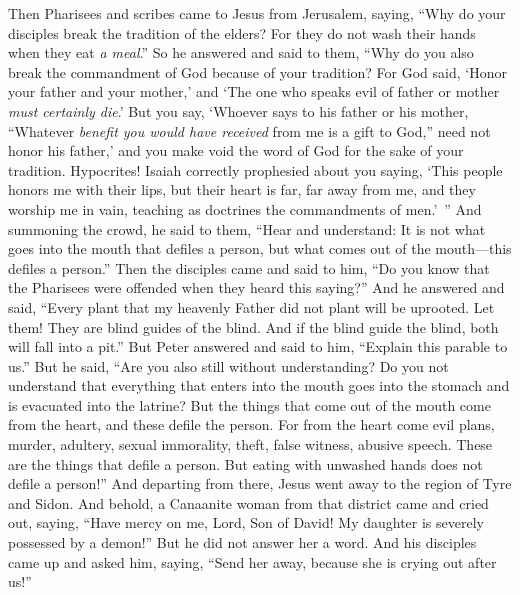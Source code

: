 \begin{biblechapter} %
 Then Pharisees and scribes came to Jesus from Jerusalem, saying,
\verse “Why do your disciples break the tradition of the elders? For they do not wash their hands when they eat \textit{a meal}.”
\verse So he answered and said to them, “Why do you also break the commandment of God because of your tradition?
\verse For God said, ‘Honor your father and your mother,’ and ‘The one who speaks evil of father or mother \textit{must certainly die}.’
\verse But you say, ‘Whoever says to his father or his mother, “Whatever \textit{benefit you would have received} from me is a gift to God,”
\verse need not honor his father,’ and you make void the word of God for the sake of your tradition.
\verse Hypocrites! Isaiah correctly prophesied about you saying,
\verse ‘This people honors me with their lips, 
but their heart is far, far away from me,
\verse and they worship me in vain, 
teaching as doctrines the commandments of men.’ ”
 And summoning the crowd, he said to them, “Hear and understand:
\verse It is not what goes into the mouth that defiles a person, but what comes out of the mouth—this defiles a person.”
\verse Then the disciples came and said to him, “Do you know that the Pharisees were offended when they heard this saying?”
\verse And he answered and said, “Every plant that my heavenly Father did not plant will be uprooted.
\verse Let them! They are blind guides of the blind. And if the blind guide the blind, both will fall into a pit.”
\verse But Peter answered and said to him, “Explain this parable to us.”
\verse But he said, “Are you also still without understanding?
\verse Do you not understand that everything that enters into the mouth goes into the stomach and is evacuated into the latrine?
\verse But the things that come out of the mouth come from the heart, and these defile the person.
\verse For from the heart come evil plans, murder, adultery, sexual immorality, theft, false witness, abusive speech.
\verse These are the things that defile a person. But eating with unwashed hands does not defile a person!”
 And departing from there, Jesus went away to the region of Tyre and Sidon.
\verse And behold, a Canaanite woman from that district came and cried out, saying, “Have mercy on me, Lord, Son of David! My daughter is severely possessed by a demon!”
\verse But he did not answer her a word. And his disciples came up and asked him, saying, “Send her away, because she is crying out after us!”

\end{biblechapter}
